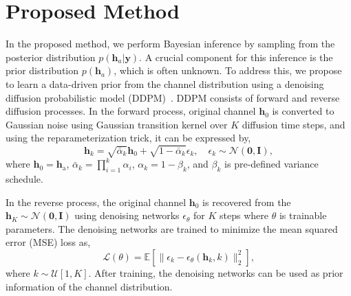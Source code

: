\documentclass[lettersize,journal]{IEEEtran}
\begin{document}
\section{Proposed Method}

In the proposed method, we perform Bayesian inference by sampling from the posterior distribution $p(\mathbf{h}_{a}|\mathbf{y})$. A crucial component for this inference is the prior distribution $p(\mathbf{h}_{a})$, which is often unknown. To address this, we propose to learn a data-driven prior from the channel distribution using a denoising diffusion probabilistic model (DDPM)~\cite{hoDenoisingDiffusionProbabilistic2020}. DDPM consists of forward and reverse diffusion processes. In the forward process, original channel $\mathbf{h}_{0}$ is converted to Gaussian noise using Gaussian transition kernel over $K$ diffusion time steps, and using the reparameterization trick, it can be expressed by,
\begin{equation}
\mathbf{h}_{k} = \sqrt{ \bar{\alpha}_{k} }\mathbf{h}_{0} + \sqrt{ 1-\bar{\alpha}_{k} }\epsilon_{k},\quad \epsilon_{k}\sim\mathcal{N}(\mathbf{0},\mathbf{I}),
\end{equation}
where $\mathbf{h}_{0} = \mathbf{h}_{\text{a}}$, $\bar{\alpha}_{k}=\prod_{i=1}^{k}\alpha_{i}$, $\alpha_{k}=1-\beta_{k}$, and $\beta_{k}$ is pre-defined variance schedule.

In the reverse process, the original channel $\mathbf{h}_{0}$ is recovered from the $\mathbf{h}_{K}\sim\mathcal{N}(\mathbf{0},\mathbf{I})$ using denoising networks $\epsilon_{\theta}$ for $K$ steps where $\theta$ is trainable parameters. The denoising networks are trained to minimize the mean squared error (MSE) loss as,
\begin{equation}
\mathcal{L}(\theta) = \mathbb{E}[\|\epsilon_{k} - \epsilon_{\theta}(\mathbf{h}_{k},k)\|_{2}^{2}],
\end{equation}
where $k\sim\mathcal{U}[1,K]$. After training, the denoising networks can be used as prior information of the channel distribution.
\end{document}
